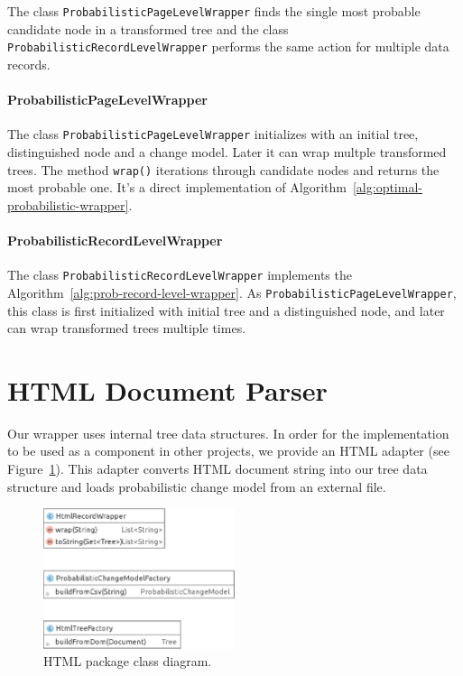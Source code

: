 The class \texttt{ProbabilisticPageLevelWrapper} finds the single most probable candidate node in a transformed tree and the class \texttt{ProbabilisticRecordLevelWrapper} performs the same action for multiple data records.


\paragraph{ProbabilisticPageLevelWrapper} The class \texttt{ProbabilisticPageLevelWrapper} initializes with an initial tree, distinguished node and a change model. Later it can wrap multple transformed trees. The method \texttt{wrap()} iterations through candidate nodes and returns the most probable one. It's a direct implementation of Algorithm~\ref{alg:optimal-probabilistic-wrapper}.

\paragraph{ProbabilisticRecordLevelWrapper} The class \texttt{ProbabilisticRecordLevelWrapper} implements the Algorithm~\ref{alg:prob-record-level-wrapper}. As \texttt{ProbabilisticPageLevelWrapper}, this class is first initialized with initial tree and a distinguished node, and later can wrap transformed trees multiple times. 


\section{HTML Document Parser}

Our wrapper uses internal tree data structures. In order for the implementation to be used as a component in other projects, we provide an HTML adapter (see Figure~\ref{fig:package-html}). This adapter converts HTML document string into our tree data structure and loads probabilistic change model from an external file.

\begin{figure}[h]
	\centering
	\includegraphics[width=0.5\textwidth]{figures/package-html}
	\caption{HTML package class diagram.}
	\label{fig:package-html}
\end{figure}

